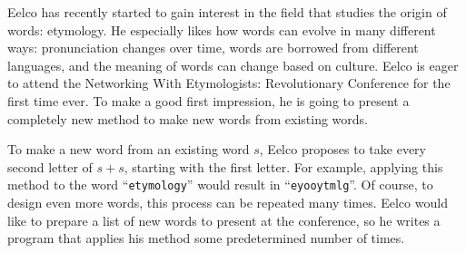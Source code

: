 




Eelco has recently started to gain interest in the field that studies the origin of words: etymology.
He especially likes how words can evolve in many different ways:
pronunciation changes over time,
words are borrowed from different languages,
and the meaning of words can change based on culture.
Eelco is eager to attend the Networking With Etymologists: Revolutionary Conference for the first time ever.
To make a good first impression,
he is going to present a completely new method to make new words from existing words.

To make a new word from an existing word $s$,
Eelco proposes to take every second letter of $s+s$,
starting with the first letter.
For example, applying this method to the word ``\texttt{etymology}'' would result in ``\texttt{eyooytmlg}''.
Of course, to design even more words, this process can be repeated many times.
Eelco would like to prepare a list of new words to present at the conference,
so he writes a program that applies his method some predetermined number of times.

